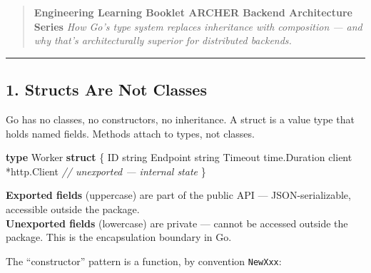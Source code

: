 \documentclass[
]{article}
\newenvironment{Shaded}{}{}
\newcommand{\CommentTok}[1]{\textcolor[rgb]{0.38,0.63,0.69}{\textit{#1}}}
\newcommand{\DataTypeTok}[1]{\textcolor[rgb]{0.56,0.13,0.00}{#1}}
\newcommand{\KeywordTok}[1]{\textcolor[rgb]{0.00,0.44,0.13}{\textbf{#1}}}
\newcommand{\NormalTok}[1]{#1}
\newcommand{\OperatorTok}[1]{\textcolor[rgb]{0.40,0.40,0.40}{#1}}
\begin{document}
\begin{quote}
\textbf{Engineering Learning Booklet \textbar{} ARCHER Backend
Architecture Series} \emph{How Go's type system replaces inheritance
with composition --- and why that's architecturally superior for
distributed backends.}
\end{quote}

\begin{center}\rule{0.5\linewidth}{0.5pt}\end{center}

\hypertarget{structs-are-not-classes}{%
\subsection{1. Structs Are Not Classes}\label{structs-are-not-classes}}

Go has no classes, no constructors, no inheritance. A struct is a value
type that holds named fields. Methods attach to types, not classes.

\begin{Shaded}
\begin{Highlighting}[]
\KeywordTok{type}\NormalTok{ Worker }\KeywordTok{struct} \OperatorTok{\{}
\NormalTok{    ID       }\DataTypeTok{string}
\NormalTok{    Endpoint }\DataTypeTok{string}
\NormalTok{    Timeout  time}\OperatorTok{.}\NormalTok{Duration}
\NormalTok{    client   }\OperatorTok{*}\NormalTok{http}\OperatorTok{.}\NormalTok{Client }\CommentTok{// unexported — internal state}
\OperatorTok{\}}
\end{Highlighting}
\end{Shaded}

\textbf{Exported fields} (uppercase) are part of the public API ---
JSON-serializable, accessible outside the package.\\
\textbf{Unexported fields} (lowercase) are private --- cannot be
accessed outside the package. This is the encapsulation boundary in Go.

The ``constructor'' pattern is a function, by convention
\texttt{NewXxx}:
\end{document}
